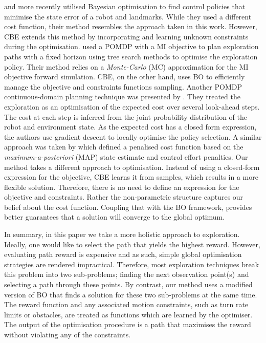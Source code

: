 \documentclass[shortAfour,sageh,times]{sagej_no_sage}
\begin{document}
\citet{Martinez-Cantin2007} and more recently \citet{Martinez-Cantin2009} utilised Bayesian optimisation to find control policies that minimise the state error of a robot and landmarks. While they used a different cost function, their method resembles the approach taken in this work. However, CBE extends this method by incorporating and learning unknown constraints during the optimisation. \citet{Lauri2015a} used a POMDP with a MI objective to plan exploration paths with a fixed horizon using tree search methods to optimise the exploration policy. Their method relies on a \textit{Monte-Carlo} (MC) approximation for the MI objective forward simulation. CBE, on the other hand, uses BO to efficiently manage the objective and constraints functions sampling. Another POMDP continuous-domain planning technique was presented by \citet{Indelman2015}. They treated the exploration as an optimisation of the expected cost over several look-ahead steps. The cost at each step is inferred from the joint probability distribution of the robot and environment state. As the expected cost has a closed form expression, the authors use gradient descent to locally optimise the policy selection. A similar approach was taken by \citet{Rafieisakhaei2016} which defined a penalised cost function based on the \textit{maximum-a-posteriori} (MAP) state estimate and control effort penalties. Our method takes a different approach to optimisation. Instead of using a closed-form expression for the objective, CBE learns it from samples, which results in a more flexible solution. Therefore, there is no need to define an expression for the objective and constraints. Rather the non-parametric structure captures our belief about the cost function. Coupling that with the BO framework, provides better guarantees that a solution will converge to the global optimum.

In summary, in this paper we take a more holistic approach to exploration. Ideally, one would like to select the path that yields the highest reward. However, evaluating path reward is expensive and as such, simple global optimisation strategies are rendered impractical. Therefore, most exploration techniques break this problem into two sub-problems; finding the next observation point(s) and selecting a path through these points. By contrast, our method uses a modified version of BO that finds a solution for these two sub-problems at the same time. The reward function and any associated motion constraints, such as turn rate limits or obstacles, are treated as functions which are learned by the optimiser. The output of the optimisation procedure is a path that maximises the reward without violating any of the constraints. 
\end{document}
